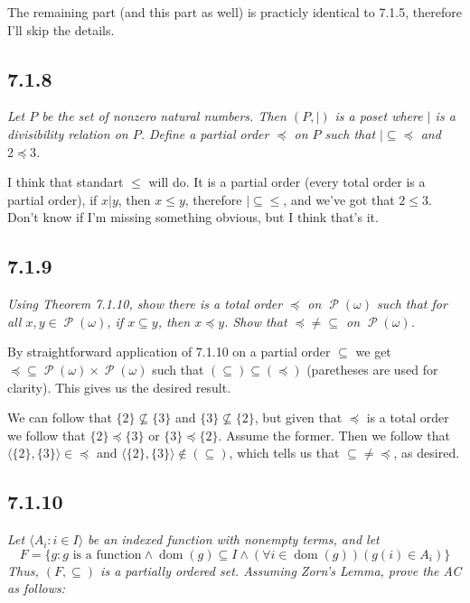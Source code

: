 \documentclass[11pt,oneside,titlepage]{book}
\DeclareMathOperator \pow {\mathcal {P}}
\DeclareMathOperator \dom {dom}
\newcommand{\eangle}[1]{\langle #1 \rangle}
\newcommand{\set}[1]{\{ #1 \}}
\begin{document}
The remaining part (and this part as well) is practicly identical to 7.1.5, therefore
I'll skip the details.

\subsection*{7.1.8}

\textit{Let $P$ be the set of nonzero natural numbers. Then $(P, |)$ is a poset
  where $|$ is a divisibility relation on $P$. Define a partial order $\preceq$ on $P$
  such that $| \subseteq \preceq$ and $2 \preceq 3$.}

I think that standart $\leq$ will do. It is a partial order
(every total order is a partial order), if $x | y$, then $x \leq y$, therefore $| \subseteq \leq$,
and we've got that $2 \leq 3$. Don't know if I'm missing something obvious, but I think
that's it.

\subsection*{7.1.9}

\textit{Using Theorem 7.1.10, show there is a total order $\preceq$ on $\pow(\omega)$
  such that for all $x, y \in \pow(\omega)$, if $x \subseteq y$, then $x \preceq y$.
  Show that $\preceq \neq \subseteq$ on $\pow(\omega)$.}

By straightforward application of 7.1.10 on a partial order $\subseteq$ we get
$\preceq \subseteq \pow(\omega) \times \pow(\omega)$ such that $(\subseteq) \subseteq (\preceq)$
(paretheses are used for clarity). This gives us the desired result.

We can follow that $\set{2} \not \subseteq \set{3}$ and  $\set{3} \not \subseteq \set{2}$,
but given that $\preceq$ is a total order we follow that
$\set{2} \preceq \set{3}$ or  $\set{3} \preceq \set{2}$. Assume the former. Then we follow that
$\eangle{\set{2}, \set{3}} \in \preceq$ and $\eangle{\set{2}, \set{3}} \notin (\subseteq)$,
which tells us that $\subseteq \neq \preceq$, as desired.

\subsection*{7.1.10}

\textit{Let $\eangle{A_i: i \in I}$ be an indexed function with nonempty terms, and let
  $$F = \set{g: g \text{ is a function} \land \dom(g) \subseteq I
    \land (\forall i \in \dom(g))(g(i) \in A_i)}$$
  Thus, $(F, \subseteq)$ is a partially ordered set. Assuming Zorn's Lemma,
  prove the AC as follows: }
\end{document}
